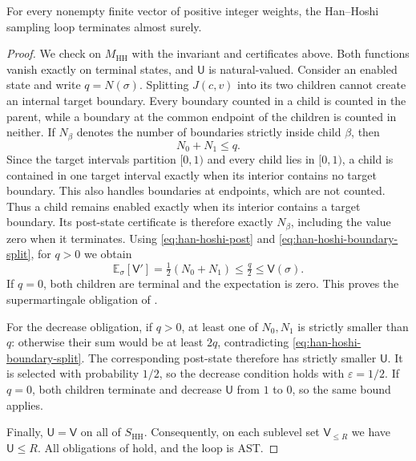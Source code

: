 \begin{theorem}
 \label{thm:han-hoshi}
For every nonempty finite vector of positive integer weights, the
Han--Hoshi sampling loop terminates almost surely.
\end{theorem}
\begin{proof}
We check  on $M_{\mathrm{HH}}$ with the
invariant and certificates above. Both functions vanish exactly on
terminal states, and $\mathsf U$ is natural-valued.
Consider an enabled state and write $q=N(\sigma)$.  Splitting $J(c,v)$
into its two children cannot create an internal target boundary.  Every
boundary counted in a child is counted in the parent, while a boundary at
the common endpoint of the children is counted in neither.  If $N_\beta$
denotes the number of boundaries strictly inside child $\beta$, then
\begin{equation}
 N_0+N_1\le q.
 \label{eq:han-hoshi-boundary-split}
\end{equation}
Since the target intervals partition $[0,1)$ and every child lies in
$[0,1)$, a child is contained in one target interval exactly when its
interior contains no target boundary. This also handles boundaries at
endpoints, which are not counted. Thus a child remains enabled exactly
when its interior contains a target boundary. Its post-state certificate
is therefore exactly $N_\beta$, including the value zero when it terminates. Using \eqref{eq:han-hoshi-post} and
\eqref{eq:han-hoshi-boundary-split}, for $q>0$ we obtain
\[
 \mathbb E_\sigma[\mathsf V']
 =\tfrac12(N_0+N_1)
 \le\tfrac q2
 \le \mathsf V(\sigma).
\]
If $q=0$, both children are terminal and the expectation is zero.  This
proves the supermartingale obligation of .

For the decrease obligation, if $q>0$, at least one of $N_0,N_1$ is
strictly smaller than $q$: otherwise their sum would be at least $2q$,
contradicting \eqref{eq:han-hoshi-boundary-split}.  The corresponding
post-state therefore has strictly smaller $\mathsf U$.  It is selected
with probability $1/2$, so the decrease condition holds with
$\varepsilon=1/2$.  If $q=0$, both children terminate and decrease
$\mathsf U$ from $1$ to $0$, so the same bound applies.

Finally, $\mathsf U=\mathsf V$ on all of $S_{\mathrm{HH}}$.  Consequently,
on each sublevel set $\mathsf V_{\le R}$ we have
$\mathsf U\le R$.  All obligations of  hold, and
the loop is AST.
\end{proof}

